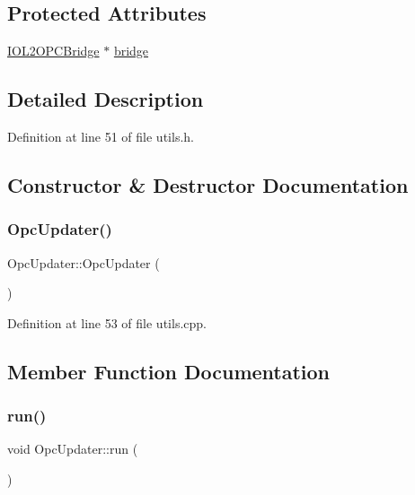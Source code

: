 \subsection*{Protected Attributes}
\begin{DoxyCompactItemize}
\item 
\hyperlink{group__iol2opc_classIOL2OPCBridge}{I\+O\+L2\+O\+P\+C\+Bridge} $\ast$ \hyperlink{classOpcUpdater_a2a19d340c7173501cc60c2a154d80946}{bridge}
\end{DoxyCompactItemize}


\subsection{Detailed Description}


Definition at line 51 of file utils.\+h.



\subsection{Constructor \& Destructor Documentation}
\mbox{\label{classOpcUpdater_a80410373d810aa38cfcecc71e0442605}} 
\subsubsection{\texorpdfstring{Opc\+Updater()}{OpcUpdater()}}
{\footnotesize\ttfamily Opc\+Updater\+::\+Opc\+Updater (\begin{DoxyParamCaption}{ }\end{DoxyParamCaption})}



Definition at line 53 of file utils.\+cpp.



\subsection{Member Function Documentation}
\mbox{\label{classOpcUpdater_ad9271871f917b0377900dc76a577773d}} 
\subsubsection{\texorpdfstring{run()}{run()}}
{\footnotesize\ttfamily void Opc\+Updater\+::run (\begin{DoxyParamCaption}{ }\end{DoxyParamCaption})\hspace{0.3cm}{\ttfamily [protected]}}



